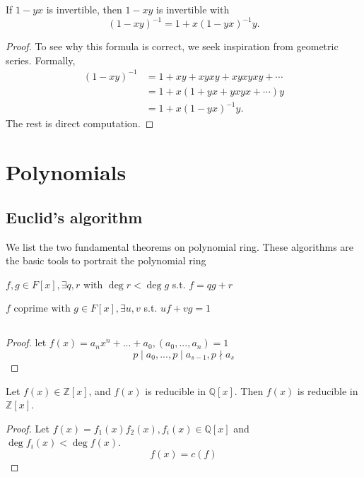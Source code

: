 \begin{theorem}
If $1-yx$ is invertible, then $1-xy$ is invertible with
\[(1-xy)^{-1}=1+x(1-yx)^{-1}y.\]
\end{theorem}
\begin{proof}
To see why this formula is correct, we seek inspiration from geometric series. Formally,
\begin{align*}
(1-xy)^{-1}&=1+xy+xyxy+xyxyxy+\cdots\\
&=1+x(1+yx+yxyx+\cdots)y\\&=1+x(1-yx)^{-1}y.
\end{align*}
The rest is direct computation.
\end{proof}
\section{Polynomials}
\subsection{Euclid's algorithm}
We list the two fundamental theorems on polynomial ring. These algorithms are the basic tools to portrait the polynomial ring
\begin{theorem}
$f,g\in F[x],\exists q,r\text{ with } \deg r<\deg g$ s.t. $f=qg+r$
\end{theorem}
\begin{theorem}
$f\text{ coprime with }g\in F[x],\exists u,v$ s.t. $uf+vg=1$
\end{theorem}


\subsection{}
\begin{lemma}
\end{lemma}
\begin{proof}
let $f(x)=a_nx^n+...+a_0,(a_0,...,a_n)=1$
\[p\mid a_0,...,p\mid a_{s-1},p\nmid a_s\]

\end{proof}

\begin{theorem}
 Let $f(x)\in \mathbb{Z}[x]$, and $f(x)$ is reducible in $\mathbb{Q}[x]$. Then $f(x)$ is reducible in $\mathbb{Z}[x]$.
\end{theorem}
\begin{proof} 
  Let $f(x)=f_1(x)f_2(x), f_i(x)\in \mathbb{Q}[x]$ and $\deg f_i(x)<\deg f(x)$.
\[f(x)=c(f)\]
\end{proof}

